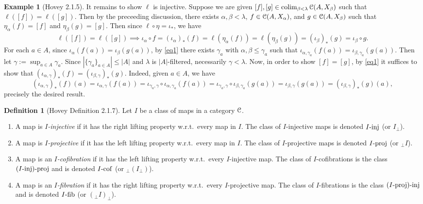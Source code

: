 \documentclass{amsart}
\theoremstyle{plain}
\theoremstyle{definition}
\newtheorem{definition}[theorem]{Definition}
\newtheorem{example}[theorem]{Example}
\newcommand{\0}{\mathbf{0}}
\newcommand{\cC}{\mathcal C}
\renewcommand{\(}{\left(}
\renewcommand{\)}{\right)}
\def\scr{\EuScript}
\def\cC{\scr{C}}
\newcommand{\inj}{\text-\mathrm{inj}}
\newcommand{\proj}{\text-\mathrm{proj}}
\newcommand{\fib}{\text-\mathrm{fib}}
\newcommand{\cof}{\text-\mathrm{cof}}
\DeclareMathOperator*{\colim}{colim}
\begin{document}
\begin{example}[Hovey 2.1.5]
  It remains to show $\ell$ is injective. Suppose we are given $[f],[g]\in\colim_{\beta<\lambda}\cC(A,X_\beta)$ such that $\ell([f])=\ell([g])$. Then by the preceeding discussion, there exists $\alpha,\beta<\lambda$, $f\in\cC(A,X_\alpha)$, and $g\in\cC(A,X_\beta)$ such that $\eta_\alpha(f)=[f]$ and $\eta_\beta(g)=[g]$. 
  Then since $\ell\circ\eta=\iota_*$, we have
  \[\ell([f])=\ell([g])\implies\iota_\alpha\circ f= (\iota_\alpha)_*(f)=\ell(\eta_\alpha(f))=\ell(\eta_\beta(g))=(\iota_\beta)_*(g)=\iota_\beta\circ g.\]
  For each $a\in A$, since $\iota_\alpha(f(a))=\iota_\beta(g(a))$, by \autoref{eq1} there exists $\gamma_a$ with $\alpha,\beta\leq\gamma_a$ such that $\iota_{\alpha,\gamma_a}(f(a))=\iota_{\beta,\gamma_a}(g(a))$. Then let $\gamma:=\sup_{a\in A}\gamma_a$. Since $|\{\gamma_a\}_{a\in A}|\leq|A|$ and $\lambda$ is $|A|$-filtered, necessarily $\gamma<\lambda$. Now, in order to show $[f]=[g]$, by \autoref{eq1} it suffices to show that $(\iota_{\alpha,\gamma})_*(f)=(\iota_{\beta,\gamma})_*(g)$. Indeed, given $a\in A$, we have
  \[(\iota_{\alpha,\gamma})_*(f)(a)=\iota_{\alpha,\gamma}(f(a))=\iota_{\gamma_a,\gamma}\circ\iota_{\alpha,\gamma_a}(f(a))=\iota_{\gamma_a,\gamma}\circ\iota_{\beta,\gamma_a}(g(a))=\iota_{\beta,\gamma}(g(a))=(\iota_{\beta,\gamma})_*(g)(a),\]
  precisely the desired result.
\end{example}

\begin{definition}[Hovey Definition 2.1.7]
  Let $I$ be a class of maps in a category $\cC$.\begin{enumerate}
    \item A map is \textit{$I$-injective} if it has the right lifting property w.r.t.\ every map in $I$. The class of $I$-injective maps is denoted $I\inj$ (or $I_\perp$).
    \item A map is \textit{$I$-projective} if it has the left lifting property w.r.t.\ every map in $I$. The class of $I$-projective maps is denoted $I\proj$ (or $_\perp I$).
    \item A map is an \textit{$I$-cofibration} if it has the left lifting property w.r.t.\ every $I$-injective map. The class of $I$-cofibrations is the class $(I\inj)\proj$ and is denoted $I\cof$ (or $_\perp(I_\perp)$).
    \item A map is an \textit{$I$-fibration} if it has the right lifting property w.r.t.\ every $I$-projective map. The class of $I$-fibrations is the class $(I\proj)\inj$ and is denoted $I\fib$ (or $(_\perp I)_\perp$).
  \end{enumerate}
\end{definition}
\end{document}
